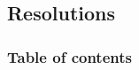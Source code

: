 \documentclass[8pt]{beamer}
\begin{document}
%      
%     
%      
%      
%     
%      
 
 \subsection{Resolutions}

\begin{frame}
 \frametitle{Table of contents}
 
\end{frame}
 
\end{document}
